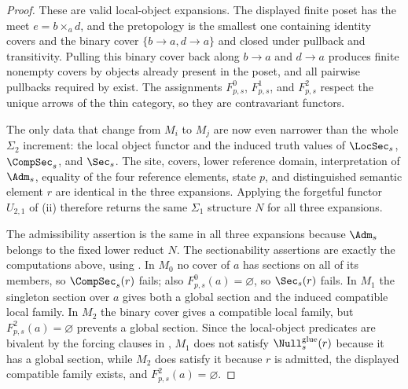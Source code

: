 \begin{proof}
These are valid local-object expansions. The displayed finite poset has the meet $e=b\times_a d$, and the pretopology is the smallest one containing identity covers and the binary cover $\{b\to a,d\to a\}$ and closed under pullback and transitivity. Pulling this binary cover back along $b\to a$ and $d\to a$ produces finite nonempty covers by objects already present in the poset, and all pairwise pullbacks required by  exist. The assignments $F^0_{p,s}$, $F^1_{p,s}$, and $F^2_{p,s}$ respect the unique arrows of the thin category, so they are contravariant functors.

The only data that change from $M_i$ to $M_j$ are now even narrower than the whole $\Sigma_2$ increment: the local object functor and the induced truth values of $\LocSec_s$, $\CompSec_s$, and $\Sec_s$. The site, covers, lower reference domain, interpretation of $\Adm_s$, equality of the four reference elements, state $p$, and distinguished semantic element $r$ are identical in the three expansions. Applying the forgetful functor $U_{2,1}$ of (ii) therefore returns the same $\Sigma_1$ structure $N$ for all three expansions.

The admissibility assertion is the same in all three expansions because $\Adm_s$ belongs to the fixed lower reduct $N$. The sectionability assertions are exactly the computations above, using . In $M_0$ no cover of $a$ has sections on all of its members, so $\CompSec_s(r)$ fails; also $F^0_{p,s}(a)=\varnothing$, so $\Sec_s(r)$ fails. In $M_1$ the singleton section over $a$ gives both a global section and the induced compatible local family. In $M_2$ the binary cover gives a compatible local family, but $F^2_{p,s}(a)=\varnothing$ prevents a global section. Since the local-object predicates are bivalent by the forcing clauses in , $M_1$ does not satisfy $\Null^{\mathrm{glue}}_s(r)$ because it has a global section, while $M_2$ does satisfy it because $r$ is admitted, the displayed compatible family exists, and $F^2_{p,s}(a)=\varnothing$.
\end{proof}


